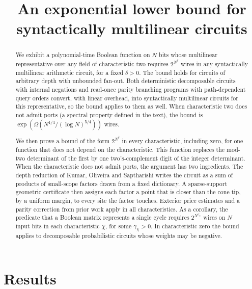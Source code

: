 \documentclass[11pt]{article}
\title{An exponential lower bound for\\syntactically multilinear circuits}
\author{}
\date{}
\theoremstyle{remark}
\begin{document}
\maketitle
\vspace{-2.5em}
\begin{abstract}
We exhibit a polynomial-time Boolean function on \(N\) bits whose multilinear
representative over any field of characteristic two requires \(2^{N^\delta}\)
wires in any syntactically multilinear arithmetic circuit, for a fixed
\(\delta>0\). The bound holds for circuits of arbitrary depth with unbounded
fan-out. Both deterministic decomposable circuits with internal negations
and read-once parity branching programs with path-dependent query orders
convert, with linear overhead, into syntactically multilinear circuits for
this representative, so the bound applies to them as well. When
characteristic two does not admit ports (a spectral property defined in
the text), the bound is \(\exp(\Omega(N^{1/4}/(\log N)^{5/4}))\) wires.

We then prove a bound of the form \(2^{N^\delta}\) in every
characteristic, including zero, for one function that does not depend on
the characteristic. This function replaces the mod-two determinant of
the first by one two's-complement digit of the integer determinant. When
the characteristic does not admit ports, the argument has two
ingredients. The depth reduction of Kumar, Oliveira and Saptharishi writes the
circuit as a sum of products of small-scope factors drawn from a fixed
dictionary. A sparse-support geometric certificate then assigns each
factor a point that is closer than the cone tip, by a uniform margin, to
every site the factor touches. Exterior
price estimates and a parity correction from prior work apply in all
characteristics. As a corollary, the predicate that a Boolean matrix
represents a single cycle requires \(2^{N^{\gamma_\chi}}\) wires
on \(N\) input bits in each characteristic \(\chi\), for some
\(\gamma_\chi>0\). In characteristic zero the bound applies to
decomposable probabilistic circuits whose weights may be negative.
\end{abstract}

\section{Results}
\end{document}
